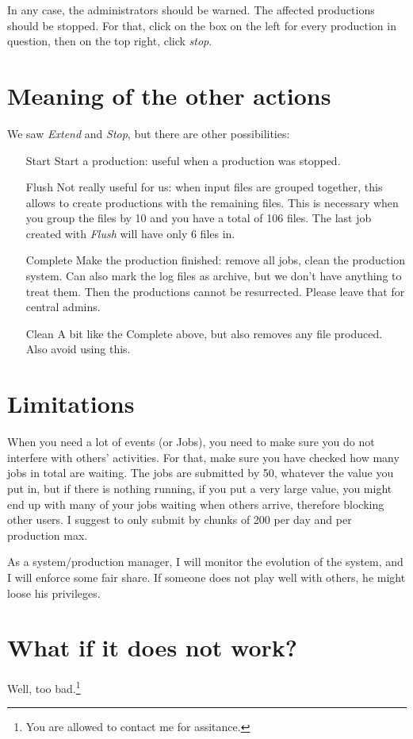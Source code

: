 \documentclass[a4paper,12pt]{article}
\begin{document}
In any case, the administrators should be warned. The affected productions
should be stopped. For that, click on the box on the left for every production
in question, then on the top right, click \emph{stop}.

\section{Meaning of the other actions}
We saw \emph{Extend} and \emph{Stop}, but there are other possibilities:
\begin{itemize}
  \item[Start] Start a production: useful when a production was stopped.
  \item[Flush] Not really useful for us: when input files are grouped together,
  this allows to create productions with the remaining files. This is necessary
  when you group the files by 10 and you have a total of 106 files. The last job
  created with \emph{Flush} will have only 6 files in. 
  \item[Complete] Make the production finished: remove all jobs, clean the
  production system. Can also mark the log files as archive, but we don't have
  anything to treat them. Then the productions cannot be resurrected. Please
  leave that for central admins.
  \item[Clean] A bit like the Complete above, but also removes any file
  produced. Also avoid using this.
\end{itemize}

\section{Limitations}
When you need a lot of events (or Jobs), you need to make sure you do not
interfere with others' activities. For that, make sure you have checked how many
jobs in total are waiting. The jobs are submitted by 50, whatever the value you
put in, but if there is nothing running, if you put a very large value, you
might end up with many of your jobs waiting when others arrive, therefore
blocking other users. I suggest to only submit by chunks of 200 per day and per
production max. 

As a system/production manager, I will monitor the evolution of the system, and
I will enforce some fair share. If someone does not play well with others, he
might loose his privileges.

\section{What if it does not work?}\label{sec:problem}
Well, too bad.\footnote{You are allowed to contact me for assitance.}
\end{document}
